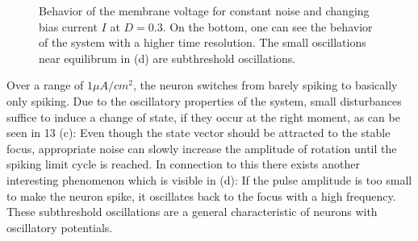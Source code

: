 \documentclass[12pt,a4paper]{article}
\begin{document}
\begin{figure}[H]
	\caption{Behavior of the membrane voltage for constant noise and changing bias current $I$ at $D=0.3$. On the bottom, one can see the behavior of the system with a higher time resolution. The small oscillations near equilibrum in (d) are subthreshold oscillations.}
	\label{ahnoise} 
\end{figure}
Over a range of $1\mu A/cm^2$, the neuron switches from barely spiking to basically only spiking. Due to the oscillatory properties of the system, small disturbances suffice to induce a change of state, if they occur at the right moment, as can be seen in 13 (c): Even though the state vector should be attracted to the stable focus, appropriate noise can slowly increase the amplitude of rotation until the spiking limit cycle is reached. In connection to this there exists another interesting phenomenon which is visible in (d): If the pulse amplitude is too small to make the neuron spike, it oscillates back to the focus with a high frequency. These subthreshold oscillations are a general characteristic of neurons with oscillatory potentials.
\end{document}
